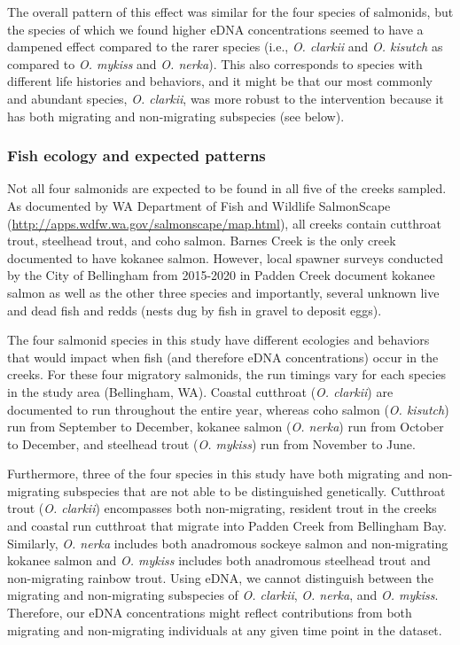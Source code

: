\documentclass[
]{article}
\begin{document}
The overall pattern of this effect was similar for the four species of
salmonids, but the species of which we found higher eDNA concentrations
seemed to have a dampened effect compared to the rarer species (i.e.,
\emph{O. clarkii} and \emph{O. kisutch} as compared to \emph{O. mykiss}
and \emph{O. nerka}). This also corresponds to species with different
life histories and behaviors, and it might be that our most commonly and
abundant species, \emph{O. clarkii}, was more robust to the intervention
because it has both migrating and non-migrating subspecies (see below).

\hypertarget{fish-ecology-and-expected-patterns}{%
\subsubsection{Fish ecology and expected
patterns}\label{fish-ecology-and-expected-patterns}}

Not all four salmonids are expected to be found in all five of the
creeks sampled. As documented by WA Department of Fish and Wildlife
SalmonScape (\url{http://apps.wdfw.wa.gov/salmonscape/map.html}), all
creeks contain cutthroat trout, steelhead trout, and coho salmon. Barnes
Creek is the only creek documented to have kokanee salmon. However,
local spawner surveys conducted by the City of Bellingham from 2015-2020
in Padden Creek document kokanee salmon as well as the other three
species and importantly, several unknown live and dead fish and redds
(nests dug by fish in gravel to deposit eggs).

The four salmonid species in this study have different ecologies and
behaviors that would impact when fish (and therefore eDNA
concentrations) occur in the creeks. For these four migratory salmonids,
the run timings vary for each species in the study area (Bellingham,
WA). Coastal cutthroat (\emph{O. clarkii}) are documented to run
throughout the entire year, whereas coho salmon (\emph{O. kisutch}) run
from September to December, kokanee salmon (\emph{O. nerka}) run from
October to December, and steelhead trout (\emph{O. mykiss}) run from
November to June.

Furthermore, three of the four species in this study have both migrating
and non-migrating subspecies that are not able to be distinguished
genetically. Cutthroat trout (\emph{O. clarkii}) encompasses both
non-migrating, resident trout in the creeks and coastal run cutthroat
that migrate into Padden Creek from Bellingham Bay. Similarly, \emph{O.
nerka} includes both anadromous sockeye salmon and non-migrating kokanee
salmon and \emph{O. mykiss} includes both anadromous steelhead trout and
non-migrating rainbow trout. Using eDNA, we cannot distinguish between
the migrating and non-migrating subspecies of \emph{O. clarkii},
\emph{O. nerka}, and \emph{O. mykiss}. Therefore, our eDNA
concentrations might reflect contributions from both migrating and
non-migrating individuals at any given time point in the dataset.
\end{document}
